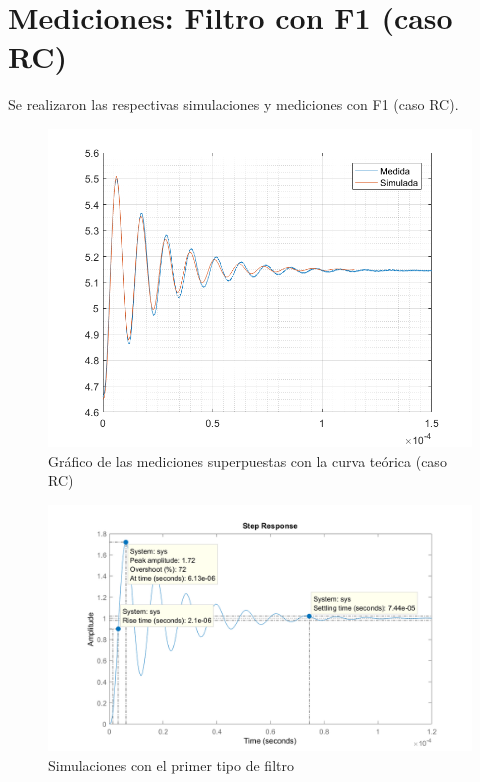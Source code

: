 \documentclass{article}
\begin{document}
\newpage
\section*{Mediciones: Filtro con F1 (caso RC)}

Se realizaron las respectivas simulaciones y mediciones con F1 (caso RC).


\begin{figure}[H]
\centering
\includegraphics[width=0.8\linewidth]{images/conF1_superpuestas.PNG}
\caption{Gráfico de las mediciones superpuestas con la curva teórica (caso RC)}
\label{fig:superpF1}
\end{figure}




\begin{figure}[H]
\centering
\includegraphics[width=1\linewidth]{images/todo.PNG}
\caption{Simulaciones con el primer tipo de filtro}
\label{fig:sim}
\end{figure}
\end{document}
